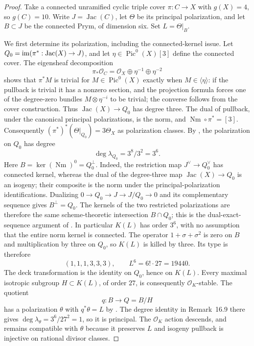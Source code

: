 \begin{proof}
Take a connected unramified cyclic triple cover $\pi:C\to X$ with $g(X)=4$, so $g(C)=10$. Write $J=\operatorname{Jac}(C)$, let $\Theta$ be its principal polarization, and let $B\subset J$ be the connected Prym, of dimension six. Set $L=\Theta|_B$.

We first determine its polarization, including the connected-kernel issue. Let $Q_0=\operatorname{im}(\pi^*:\operatorname{Jac}(X)\to J)$, and let $\eta\in\operatorname{Pic}^0(X)[3]$ define the connected cover. The eigensheaf decomposition
\[
\pi_*\mathcal O_C=\mathcal O_X\oplus\eta^{-1}\oplus\eta^{-2}
\]
shows that $\pi^*M$ is trivial for $M\in\operatorname{Pic}^0(X)$ exactly when $M\in\langle\eta\rangle$: if the pullback is trivial it has a nonzero section, and the projection formula forces one of the degree-zero bundles $M\otimes\eta^{-i}$ to be trivial; the converse follows from the cover construction. Thus $\operatorname{Jac}(X)\to Q_0$ has degree three. The dual of pullback, under the canonical principal polarizations, is the norm, and $\operatorname{Nm}\circ\pi^*=[3]$. Consequently $(\pi^*)^*(\Theta|_{Q_0})=3\Theta_X$ as polarization classes. By \cite[Theorem 13.3, p.~25; Remark 16.9, p.~33]{MilneAV}, the polarization on $Q_0$ has degree
\[
\deg\lambda_{Q_0}=3^8/3^2=3^6.
\]
Here $B=\ker(\operatorname{Nm})^0=Q_0^\perp$. Indeed, the restriction map $J^\vee\to Q_0^\vee$ has connected kernel, whereas the dual of the degree-three map $\operatorname{Jac}(X)\to Q_0$ is an isogeny; their composite is the norm under the principal-polarization identifications. Dualizing $0\to Q_0\to J\to J/Q_0\to0$ and its complementary sequence gives $B^\perp=Q_0$. The kernels of the two restricted polarizations are therefore the same scheme-theoretic intersection $B\cap Q_0$; this is the dual-exact-sequence argument of \cite[\S11, pp.~17--18]{MilneAV}. In particular $K(L)$ has order $3^6$, with no assumption that the entire norm kernel is connected. The operator $1+\sigma+\sigma^2$ is zero on $B$ and multiplication by three on $Q_0$, so $K(L)$ is killed by three. Its type is therefore
\[
(1,1,1,3,3,3),\qquad L^6=6!\cdot27=19440.
\]
The deck transformation is the identity on $Q_0$, hence on $K(L)$. Every maximal isotropic subgroup $H\subset K(L)$, of order $27$, is consequently $\mathcal O_K$-stable. The quotient
\[
q:B\longrightarrow Q=B/H
\]
has a polarization $\theta$ with $q^*\theta=L$ by \cite[Proposition 16.8, p.~33]{MilneAV}. The degree identity in Remark~16.9 there gives $\deg\lambda_\theta=3^6/27^2=1$, so it is principal. The $\mathcal O_K$ action descends, and remains compatible with $\theta$ because it preserves $L$ and isogeny pullback is injective on rational divisor classes.


\end{proof}
